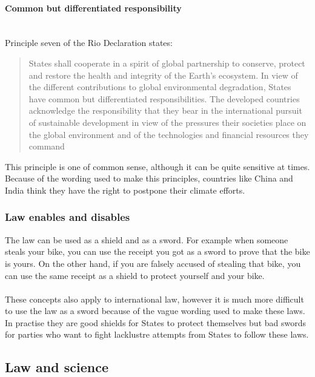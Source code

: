 \documentclass[../summary.tex]{subfiles}
\begin{document}
			\paragraph{Common but differentiated responsibility}\mbox{}\\
				\label{par:13-comm-diff-res}
				Principle seven of the Rio Declaration states:
				\begin{quote}
					States shall cooperate in a spirit of global partnership to conserve, protect and restore the health and integrity of the Earth's ecosystem. In view of the different contributions to global environmental degradation, States have common but differentiated responsibilities. The developed countries acknowledge the responsibility that they bear in the international pursuit of sustainable development in view of the pressures their societies place on the global environment and of the technologies and financial resources they command
				\end{quote}
				This principle is one of common sense, although it can be quite sensitive at times. Because of the wording used to make this principles, countries like China and India think they have the right to postpone their climate efforts. 
				
			\subsubsection{Law enables and disables}
				The law can be used as a shield and as a sword. For example when someone steals your bike, you can use the receipt you got as a sword to prove that the bike is yours. On the other hand, if you are falsely accused of stealing that bike, you can use the same receipt as a shield to protect yourself and your bike. 
				\\\\
				These concepts also apply to international law, however it is much more difficult to use the law as a sword because of the vague wording used to make these laws. In practise they are good shields for States to protect themselves but bad swords for parties who want to fight lacklustre attempts from States to follow these laws. 
				\newpage
				
	\subsection{Law and science}
\end{document}
